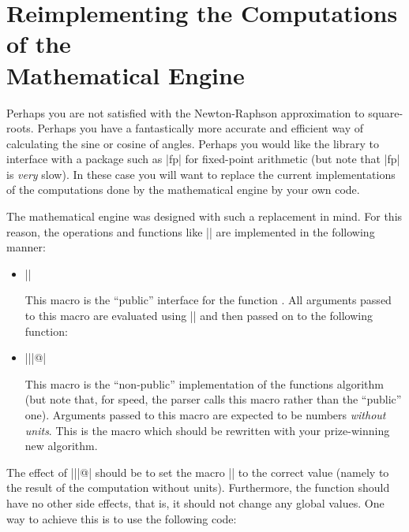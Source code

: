 %
%
%


\section[Reimplementing the Computations of the Mathematical Engine]
  {Reimplementing the Computations of the\\ Mathematical Engine}

\label{pgfmath-reimplement}

Perhaps you are not satisfied with the Newton-Raphson approximation to
square-roots. Perhaps you have a fantastically more accurate
and efficient way of calculating the sine or cosine of angles. Perhaps
 you would like the library to interface with a package such as |fp| 
 for fixed-point arithmetic (but note that |fp| is \emph{very} slow).
In these case you will want to replace the current implementations of
the computations done by the mathematical engine by your own code. 

The mathematical engine was designed with such a replacement in
mind. For this reason, the operations and functions like |\pgfmathadd|
are implemented in the following manner: 

\begin{itemize}
\item |\pgfmath| 

  This macro is the ``public'' interface for the function
  . All arguments passed to this macro are 
  evaluated using |\pgfmathparse| and then passed on to the following
  function:
  
\item |\pgfmath||@|
  
  This macro is the ``non-public'' implementation of the functions 
  algorithm (but note that, for speed, the parser calls this macro 
  rather than the ``public'' one). Arguments passed to this macro 
  are expected to be numbers \emph{without units}. This is the macro 
  which should be rewritten with your prize-winning new algorithm.
	
\end{itemize}

The effect of |\pgfmath||@| should be to set the
macro |\pgfmathresult| to the correct value (namely to the result of
the computation without units). Furthermore, the function should have
no other side effects, that is, it should not change any global
values. One way to achieve this is to use the following code:

